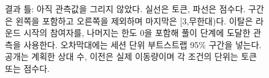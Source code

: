 \begin{figure}[H]
\caption{결과 틀: 아직 관측값을 그리지 않았다. 실선은 토큰, 파선은 점수다. 구간은 왼쪽을 포함하고 오른쪽을 제외하며 마지막은 [3,무한대)다. 이탈은 라운드 시작의 참여자를, 나머지는 한도 0을 포함해 풀이 단계에 도달한 관측을 사용한다. 오차막대에는 세션 단위 부트스트랩 95\% 구간을 넣는다. 공개는 계획한 상대 수, 이전은 실제 이동량이며 각 조건의 단위는 토큰 또는 점수다.}
\label{fig:e52-behavior}
\end{figure}
